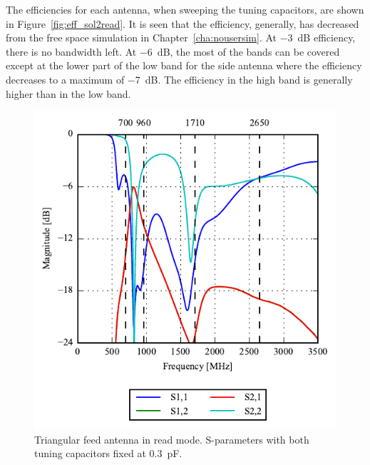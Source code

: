 The efficiencies for each antenna, when sweeping the tuning capacitors, are shown in Figure~\ref{fig:eff_sol2read}. It is seen that the efficiency, generally, has decreased from the free space simulation in Chapter~\ref{cha:nousersim}. At  \SI{-3}{dB} efficiency, there is no bandwidth left. At \SI{-6}{dB}, the most of the bands can be covered except at the lower part of the low band for the side antenna where the efficiency decreases to a maximum of \SI{-7}{dB}. The efficiency in the high band is generally higher than in the low band.

\begin{figure}[htbp]
    \centering
    \includegraphics{img/tech_sol/trianglefeed/read_mode/sparams.pdf}
    \caption{Triangular feed antenna in read mode. S-parameters with both tuning capacitors fixed at \SI{0.3}{pF}.}
    \label{fig:triang_sparam_read}
\end{figure}


